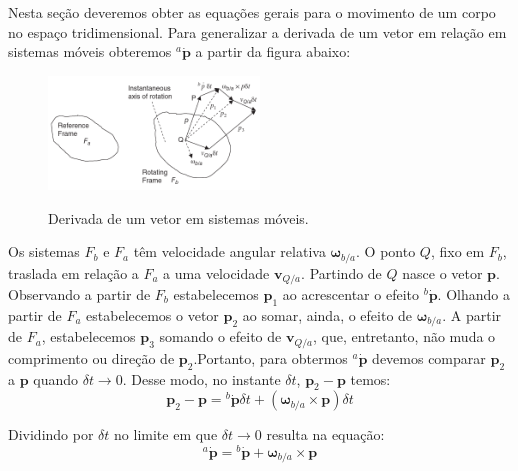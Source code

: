 Nesta seção deveremos obter as equações gerais para o movimento de um corpo no espaço tridimensional. Para generalizar a derivada de um vetor em relação em sistemas móveis obteremos \(^{a}\dot{\mathbf{p}}\) a partir da figura abaixo:
\begin{figure}[H]
    \centering
    \includegraphics[width=0.5\textwidth, keepaspectratio]{figuras/figure1.4-1.png}\label{fig1.4-1}
    \caption{Derivada de um vetor em sistemas móveis.}
\end{figure}

Os sistemas \(F_{b}\) e \(F_{a}\) têm velocidade angular relativa \(\mathbf{\omega}_{b/a}\). O ponto \(Q\), fixo em \(F_{b}\), traslada em relação a \(F_{a}\) a uma velocidade \(\mathbf{v}_{Q/a}\). Partindo de  \(Q\) nasce o vetor \(\mathbf{p}\). Observando a partir de \(F_{b}\) estabelecemos \(\mathbf{p}_{1}\) ao acrescentar o efeito \({^b\dot{\mathbf{p}}}\). Olhando a partir de \(F_{a}\) estabelecemos o vetor  \(\mathbf{p}_{2}\) ao somar, ainda, o efeito de \(\mathbf{\omega}_{b/a}\). A partir de \(F_{a}\), estabelecemos \(\mathbf{p}_{3}\) somando o efeito de \(\mathbf{v}_{Q/a}\), que, entretanto, não muda o comprimento ou direção de \(\mathbf{p}_{2}\).Portanto, para obtermos \(^{a}\dot{\mathbf{p}}\) devemos  comparar \(\mathbf{p}_{2}\) a \(\mathbf{p}\) quando \(\delta t \rightarrow 0\). Desse modo, no instante \(\delta t\), \(\mathbf{p}_{2} \!-\! \mathbf{p}\) temos:
\begin{equation*}
    \mathbf{p}_{2} - \mathbf{p} = {^{b}\dot{\mathbf{p}}} \delta t + \left( \mathbf{\omega}_{b/a} \! \times \!\mathbf{p} \right) \delta t
\end{equation*}

Dividindo por \(\delta t\) no limite em que \(\delta t \rightarrow 0\) resulta na equação\footnotemark{}:
\begin{equation*} \tag{1.4-2}
    {^{a}\dot{\mathbf{p}}} = {^{b}\dot{\mathbf{p}}} + {\mathbf{\omega}_{b/a} \! \times \!\mathbf{p}}
\end{equation*}


